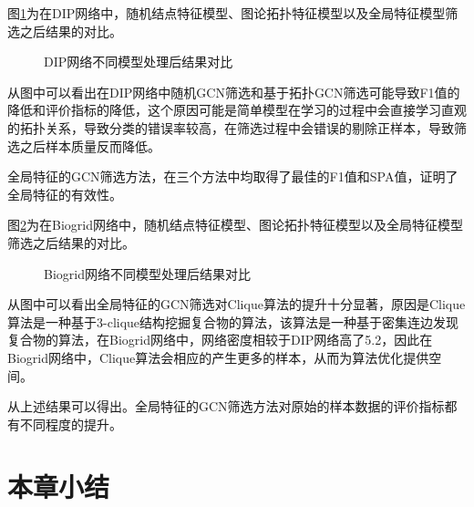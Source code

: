 图\ref{fig:result/DIP/node}为在DIP网络中，随机结点特征模型、图论拓扑特征模型以及全局特征模型筛选之后结果的对比。
\begin{figure}[htbp]
    \centering
    \vskip0.2cm
    \caption{DIP网络不同模型处理后结果对比}
    \label{fig:result/DIP/node}
\end{figure}

从图中可以看出在DIP网络中随机GCN筛选和基于拓扑GCN筛选可能导致F1值的降低和评价指标的降低，这个原因可能是简单模型在学习的过程中会直接学习直观的拓扑关系，导致分类的错误率较高，在筛选过程中会错误的剔除正样本，导致筛选之后样本质量反而降低。

全局特征的GCN筛选方法，在三个方法中均取得了最佳的F1值和SPA值，证明了全局特征的有效性。

图\ref{fig:result/Biogrid/node}为在Biogrid网络中，随机结点特征模型、图论拓扑特征模型以及全局特征模型筛选之后结果的对比。
\begin{figure}[htbp]
    \centering
    \vskip0.2cm
    \caption{Biogrid网络不同模型处理后结果对比}
    \label{fig:result/Biogrid/node}
\end{figure}

从图中可以看出全局特征的GCN筛选对Clique算法的提升十分显著，原因是Clique算法是一种基于3-clique结构挖掘复合物的算法，该算法是一种基于密集连边发现复合物的算法，在Biogrid网络中，网络密度相较于DIP网络高了5.2，因此在Biogrid网络中，Clique算法会相应的产生更多的样本，从而为算法优化提供空间。

从上述结果可以得出。全局特征的GCN筛选方法对原始的样本数据的评价指标都有不同程度的提升。

\section{本章小结}
\label{section:NodeConv:summary}